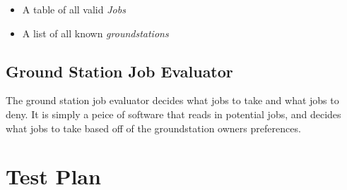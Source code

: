 \documentclass{article}
\begin{document}
\begin{itemize}
  \item A table of all valid \textit{Jobs}
  \item A list of all known \textit{groundstations}
\end{itemize}


\subsection{Ground Station Job Evaluator}

The ground station job evaluator decides what jobs to take and what jobs to
deny. It is simply a peice of software that reads in potential jobs, and
decides what jobs to take based off of the groundstation owners preferences.

\section{Test Plan}
\end{document}

